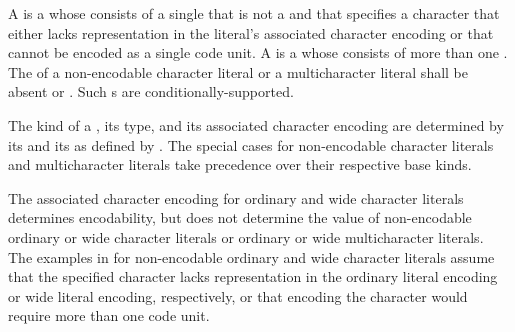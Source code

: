 \pnum
{}%
%
%
%
%
%
%
%
%
%
A 
is a 
whose  consists of a single 
that is not a  and
that specifies a character
that either lacks representation in the literal's associated character encoding
or that cannot be encoded as a single code unit.
A  is a 
whose  consists of
more than one .
The  of
a non-encodable character literal or a multicharacter literal
shall be absent or .
Such s are conditionally-supported.

\pnum
The kind of a ,
its type, and its associated character encoding
are determined by
its  and its 
as defined by .
The special cases for
non-encodable character literals and multicharacter literals
take precedence over their respective base kinds.
\begin{note}
The associated character encoding for ordinary and wide character literals
determines encodability,
but does not determine the value of
non-encodable ordinary or wide character literals or
ordinary or wide multicharacter literals.
The examples in 
for non-encodable ordinary and wide character literals assume that
the specified character lacks representation in
the ordinary literal encoding or wide literal encoding, respectively, or
that encoding the character would require more than one code unit.
\end{note}

